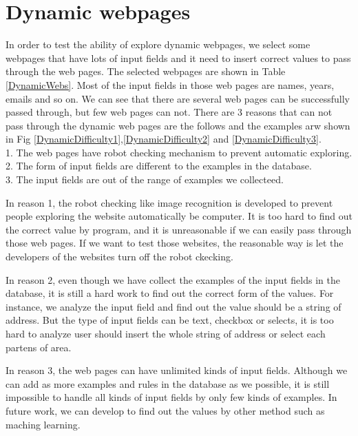 
\clearpage

\section{Dynamic webpages}

In order to test the ability of explore dynamic webpages,
we select some webpages that have lots of input fields and it need to insert correct values to pass through the web pages.
The selected webpages are shown in Table \ref{DynamicWebs}.
Most of the input fields in those web pages are names, years, emails and so on.
We can see that there are several web pages can be successfully passed through, but few web pages can not.
There are 3 reasons that can not pass through the dynamic web pages are the follows
and the examples arw shown in Fig \ref{DynamicDifficulty1},\ref{DynamicDifficulty2} and \ref{DynamicDifficulty3}.
\\	1. The web pages have robot checking mechanism to prevent automatic exploring.
\\	2. The form of input fields are different to the examples in the database.
\\	3. The input fields are out of the range of examples we collecteed.
	
In reason 1, the robot checking like image recognition is developed to prevent people exploring the website automatically be computer.
It is too hard to find out the correct value by program,
and it is unreasonable if we can easily pass through those web pages.
If we want to test those websites,
the reasonable way is let the developers of the websites turn off the robot ckecking.

In reason 2, even though we have collect the examples of the input fields in the database, 
it is still a hard work to find out the correct form of the values.
For instance, we analyze the input field and find out the value should be a string of address.
But the type of input fields can be text, checkbox or selects, 
it is too hard to analyze user should insert the whole string of address or select each partens of area.

In reason 3, the web pages can have unlimited kinds of input fields.
Although we can add as more examples and rules in the database as we possible,
it is still impossible to handle all kinds of input fields by only few kinds of examples.
In future work, we can develop to find out the values by other method such as maching learning.

